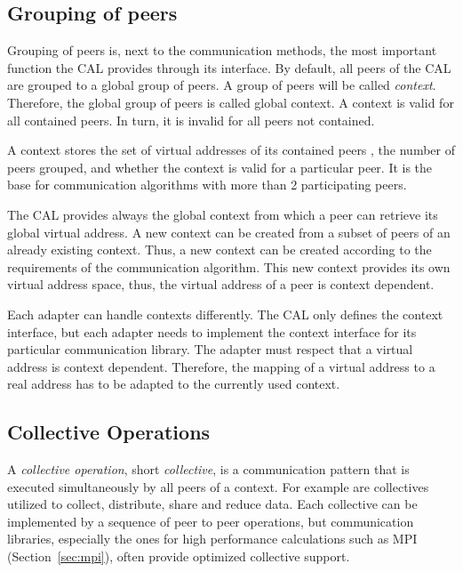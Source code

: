 \subsection{Grouping of peers}
\label{sec:cal_context}
Grouping of peers is, next to the communication methods, the most
important function the CAL provides through its interface.  By
default, all peers of the CAL are grouped to a global group of peers.
A group of peers will be called \textit{context}. Therefore, the
global group of peers is called global context. A context is valid for
all contained peers. In turn, it is invalid for all peers not
contained.

A context stores the set of virtual addresses of its contained peers , the
number of peers grouped, and whether the context is valid for a particular
peer. It is the base for communication algorithms with more than 2
participating peers.

The CAL provides always the global context from which a peer can
retrieve its global virtual address. A new context can be created from
a subset of peers of an already existing context. Thus, a new context
can be created according to the requirements of the communication
algorithm. This new context provides its own virtual address space,
thus, the virtual address of a peer is context dependent.

Each adapter can handle contexts differently. The CAL only
defines the context interface, but each adapter needs to implement the
context interface for its particular communication
library. The adapter must respect that a virtual address
is context dependent. Therefore, the mapping of a virtual address to a
real address has to be adapted to the currently used context.

\subsection{Collective Operations}
\label{sec:cal_collective}
A \textit{collective operation}, short \textit{collective}, is a
communication pattern that is executed simultaneously by all peers of
a context. For example are collectives utilized to collect, distribute,
share and reduce data.  Each collective can be implemented by a
sequence of peer to peer operations, but communication libraries,
especially the ones for high performance calculations such as MPI
(Section~\ref{sec:mpi}), often provide optimized collective support.

